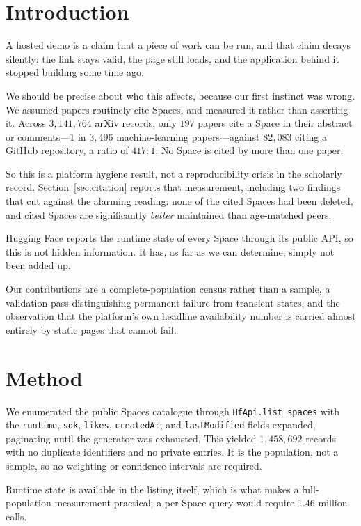 \documentclass[11pt]{article}
\begin{document}
\section{Introduction}

A hosted demo is a claim that a piece of work can be run, and that claim decays
silently: the link stays valid, the page still loads, and the application
behind it stopped building some time ago.

We should be precise about who this affects, because our first instinct was
wrong. We assumed papers routinely cite Spaces, and measured it rather than
asserting it. Across $3{,}141{,}764$ arXiv records, only $197$ papers cite a
Space in their abstract or comments---$1$ in $3{,}496$ machine-learning
papers---against $82{,}083$ citing a GitHub repository, a ratio of $417{:}1$.
No Space is cited by more than one paper.

So this is a platform hygiene result, not a reproducibility crisis in the
scholarly record. Section~\ref{sec:citation} reports that measurement,
including two findings that cut against the alarming reading: none of the
cited Spaces had been deleted, and cited Spaces are significantly
\emph{better} maintained than age-matched peers.

Hugging Face reports the runtime state of every Space through its public API,
so this is not hidden information. It has, as far as we can determine, simply
not been added up.

Our contributions are a complete-population census rather than a sample, a
validation pass distinguishing permanent failure from transient states, and
the observation that the platform's own headline availability number is
carried almost entirely by static pages that cannot fail.

\section{Method}

We enumerated the public Spaces catalogue through
\texttt{HfApi.list\_spaces} with the \texttt{runtime}, \texttt{sdk},
\texttt{likes}, \texttt{createdAt}, and \texttt{lastModified} fields expanded,
paginating until the generator was exhausted. This yielded $1{,}458{,}692$
records with no duplicate identifiers and no private entries. It is the
population, not a sample, so no weighting or confidence intervals are required.

Runtime state is available in the listing itself, which is what makes a
full-population measurement practical; a per-Space query would require 1.46
million calls.
\end{document}
